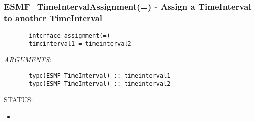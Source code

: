  
\setlength{\oldparskip}{\parskip}
\setlength{\parskip}{1.5ex}
\setlength{\oldparindent}{\parindent}
\setlength{\parindent}{0pt}
\setlength{\oldbaselineskip}{\baselineskip}
\setlength{\baselineskip}{11pt}
 
\def\bv{\begin{verbatim}}
\def\ev{\end{verbatim}}
\def\be{\begin{equation}}
\def\ee{\end{equation}}
\def\bea{\begin{eqnarray}}
\def\eea{\end{eqnarray}}
\def\bi{\begin{itemize}}
\def\ei{\end{itemize}}
\def\bn{\begin{enumerate}}
\def\en{\end{enumerate}}
\def\bd{\begin{description}}
\def\ed{\end{description}}
\def\({\left (}
\def\){\right )}
\def\[{\left [}
\def\]{\right ]}
\def\<{\left  \langle}
\def\>{\right \rangle}
\def\cI{{\cal I}}
\def\diag{\mathop{\rm diag}}
\def\tr{\mathop{\rm tr}}


 
\subsubsection [ESMF\_TimeIntervalAssignment(=)] {ESMF\_TimeIntervalAssignment(=) - Assign a TimeInterval to another TimeInterval}


  
\begin{verbatim}       interface assignment(=)
       timeinterval1 = timeinterval2\end{verbatim}{\em ARGUMENTS:}
\begin{verbatim}       type(ESMF_TimeInterval) :: timeinterval1
       type(ESMF_TimeInterval) :: timeinterval2
   \end{verbatim}
{\sf STATUS:}
   \begin{itemize}
   \item{}
   \end{itemize}
  
